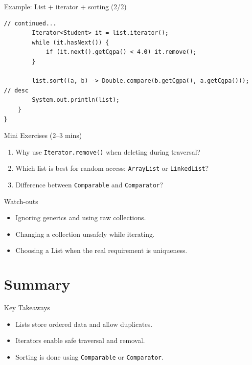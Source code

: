 \documentclass{beamer}
\begin{document}
\begin{frame}[fragile]{Example: List + iterator + sorting (2/2)}
\begin{lstlisting}
// continued...
        Iterator<Student> it = list.iterator();
        while (it.hasNext()) {
            if (it.next().getCgpa() < 4.0) it.remove();
        }

        list.sort((a, b) -> Double.compare(b.getCgpa(), a.getCgpa())); // desc
        System.out.println(list);
    }
}
\end{lstlisting}
  \slidesources{\OOPSUnitVSources}
\end{frame}

\begin{frame}{Mini Exercises (2--3 mins)}
  \begin{enumerate}[<+->]
    \item Why use \texttt{Iterator.remove()} when deleting during traversal?
    \item Which list is best for random access: \texttt{ArrayList} or \texttt{LinkedList}?
    \item Difference between \texttt{Comparable} and \texttt{Comparator}?
  \end{enumerate}
  \slidesources{\OOPSUnitVSources}
\end{frame}

\begin{frame}{Watch-outs}
\begin{itemize}[<+->]
  \item Ignoring generics and using raw collections.
  \item Changing a collection unsafely while iterating.
  \item Choosing a List when the real requirement is uniqueness.
\end{itemize}
  \slidesources{\OOPSUnitVSources}
\end{frame}

\section{Summary}
\label{sec:summary}

\begin{frame}{Key Takeaways}
  \begin{itemize}[<+->]
    \item Lists store ordered data and allow duplicates.
    \item Iterators enable safe traversal and removal.
    \item Sorting is done using \texttt{Comparable} or \texttt{Comparator}.
  \end{itemize}
  \slidesources{\OOPSUnitVSources}
\end{frame}
\end{document}
